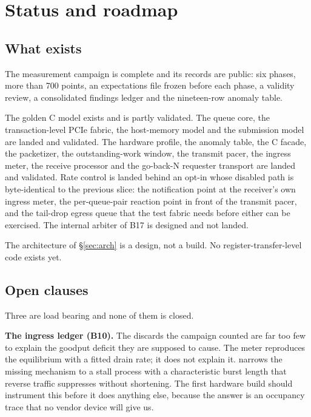 \section{Status and roadmap}
\label{sec:status}

\subsection{What exists}

The measurement campaign is complete and its records are public: six phases,
more than 700 points, an expectations file frozen before each phase, a validity
review, a consolidated findings ledger and the nineteen-row anomaly table.

The golden C model exists and is partly validated. The queue core, the
transaction-level PCIe fabric, the host-memory model and the submission model
are landed and validated. The hardware profile, the anomaly table, the C
facade, the packetizer, the outstanding-work window, the transmit pacer, the
ingress meter, the receive processor and the go-back-N requester transport are
landed and validated. Rate control is landed behind an opt-in whose disabled
path is byte-identical to the previous slice: the notification point at the
receiver's own ingress meter, the per-queue-pair reaction point in front of the
transmit pacer, and the tail-drop egress queue that the test fabric needs
before either can be exercised. The internal arbiter of B17 is designed and not
landed.

The architecture of \S\ref{sec:arch} is a design, not a build. No
register-transfer-level code exists yet. 

\subsection{Open clauses}

Three are load bearing and none of them is closed.

\textbf{The ingress ledger (B10).} The discards the campaign counted are far
too few to explain the goodput deficit they are supposed to cause. The meter
reproduces the equilibrium with a fitted drain rate; it does not explain it.
 narrows the missing mechanism to a stall process with a
characteristic burst length that reverse traffic suppresses without shortening.
The first hardware build should instrument this before it does anything else,
because the answer is an occupancy trace that no vendor device will give us.

